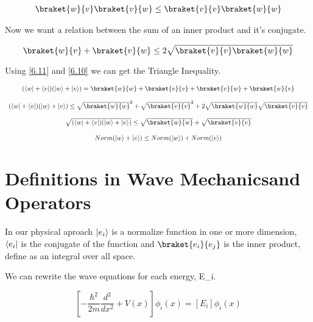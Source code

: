 \begin{equation}
  \label{6.10}
  \begin{array}{c}
    \braket{w}{v}\braket{v}{w} \leq \braket{v}{v} \braket{w}{w}
  \end{array}
\end{equation}

Now we want a relation between the sum of an inner product and it's conjugate.

\begin{equation}
  \label{6.11}
  \braket{w}{v}+\braket{v}{w} \leq 2 \sqrt{\braket{v}{v} \braket{w}{w}}
\end{equation}

Using \ref{6.11} and \ref{6.10} we can get the Triangle Inequality.

\begin{equation}
  \label{6.12}
  \begin{array}{c}
    (\bra{w}+\bra{v})(\ket{w}+\ket{v}) = \braket{w}{w}+\braket{v}{v}+\braket{v}{w}+\braket{w}{v}
    \\

    \\
    (\bra{w}+\bra{v})(\ket{w}+\ket{v}) \leq \sqrt{\braket{w}{w}}^2 + \sqrt{\braket{v}{v}}^2 + 2 \sqrt{\braket{w}{w}} \sqrt{\braket{v}{v}}
    \\

    \\
    \sqrt{(\bra{w}+\bra{v})(\ket{w}+\ket{v})} \leq \sqrt{\braket{w}{w}} + \sqrt{\braket{v}{v}}
    \\

    \\
    Norm(\ket{w}+\ket{v}) \leq Norm(\ket{w}) + Norm(\ket{v})
  \end{array}
\end{equation}

\section{Definitions in Wave Mechanicsand Operators}

In our physical aproach $\lvert e_i\rangle$ is a normalize function in one or more dimension, $\langle e_i\rvert$ is the conjugate of the function and $\braket{e_i}{e_j}$ is the inner product, define as an integral over all space.

We can rewrite the wave equations for each energy, E_i.

\begin{equation}
\label{6.13}
\left[-\frac{\hbar^2}{2m} \frac{d^2}{dx^2}+ V(x) \right] \phi_i(x) = [E_i] \phi_i(x)
\end{equation}

